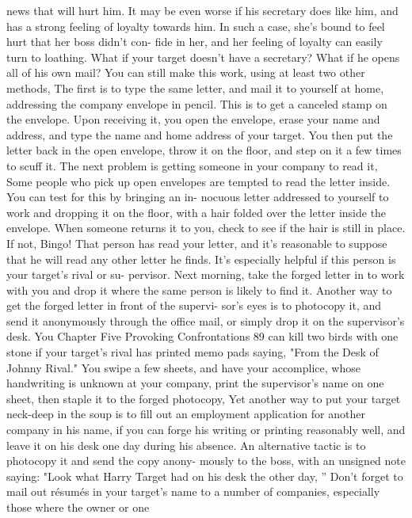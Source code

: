 \documentclass{book}
\begin{document}
news that will hurt him. It may be even worse if his secretary 
does like him, and has a strong feeling of loyalty towards him. 
In such a case, she’s bound to feel hurt that her boss didn't con- 
fide in her, and her feeling of loyalty can easily turn to loathing. 
What if your target doesn't have a secretary? What if he 
opens all of his own mail? You can still make this work, using 
at least two other methods, 
The first is to type the same letter, and mail it to yourself at 
home, addressing the company envelope in pencil. This is to get 
a canceled stamp on the envelope. Upon receiving it, you open 
the envelope, erase your name and address, and type the name 
and home address of your target. You then put the letter back in 
the open envelope, throw it on the floor, and step on it a few 
times to scuff it. 
The next problem is getting someone in your company to 
read it, Some people who pick up open envelopes are tempted 
to read the letter inside. You can test for this by bringing an in- 
nocuous letter addressed to yourself to work and dropping it on 
the floor, with a hair folded over the letter inside the envelope. 
When someone returns it to you, check to see if the hair is still 
in place. If not, Bingo! That person has read your letter, and it's 
reasonable to suppose that he will read any other letter he finds. 
It's especially helpful if this person is your target's rival or su- 
pervisor. Next morning, take the forged letter in to work with 
you and drop it where the same person is likely to find it. 
Another way to get the forged letter in front of the supervi- 
sor's eyes is to photocopy it, and send it anonymously through 
the office mail, or simply drop it on the supervisor's desk. You 
Chapter Five 
Provoking Confrontations 
89 
can kill two birds with one stone if your target's rival has 
printed memo pads saying, "From the Desk of Johnny Rival." 
You swipe a few sheets, and have your accomplice, whose 
handwriting is unknown at your company, print the supervisor's 
name on one sheet, then staple it to the forged photocopy, 
Yet another way to put your target neck-deep in the soup is 
to fill out an employment application for another company in 
his name, if you can forge his writing or printing reasonably 
well, and leave it on his desk one day during his absence. An 
alternative tactic is to photocopy it and send the copy anony- 
mously to the boss, with an unsigned note saying: 
"Look what Harry Target had on his desk the other day, ” 
Don't forget to mail out résumés in your target's name to a 
number of companies, especially those where the owner or one 
\end{document}
